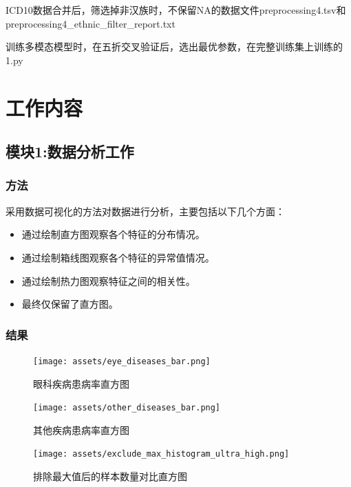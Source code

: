 \documentclass[UTF8]{report}
\theoremstyle{MyLineTheoremStyle} %
\theoremstyle{MyBlockTheoremStyle} %
\theoremstyle{MySubsubsectionStyle} %
\begin{document}
ICD10数据合并后，筛选掉非汉族时，不保留NA的数据文件preprocessing4.tsv和preprocessing4\_ethnic\_filter\_report.txt

训练多模态模型时，在五折交叉验证后，选出最优参数，在完整训练集上训练的1.py







\chapter{工作内容}

\section{模块1:数据分析工作}

\subsection*{方法}
采用数据可视化的方法对数据进行分析，主要包括以下几个方面：
\begin{itemize}
    \item 通过绘制直方图观察各个特征的分布情况。
    \item 通过绘制箱线图观察各个特征的异常值情况。
    \item 通过绘制热力图观察特征之间的相关性。
    \item 最终仅保留了直方图。
\end{itemize}

\subsection*{结果}
\begin{figure}[H]
    \centering
    \texttt{[image: assets/eye\_diseases\_bar.png]}
    \caption{眼科疾病患病率直方图}
    \label{fig:eye_diseases_bar}
\end{figure}

\begin{figure}[H]
    \centering
    \texttt{[image: assets/other\_diseases\_bar.png]}
    \caption{其他疾病患病率直方图}
    \label{fig:other_diseases_bar}
\end{figure}

\begin{figure}[H]
    \centering
    \texttt{[image: assets/exclude\_max\_histogram\_ultra\_high.png]}
    \caption{排除最大值后的样本数量对比直方图}
    \label{fig:exclude_max_histogram_ultra_high}
\end{figure}
\end{document}
